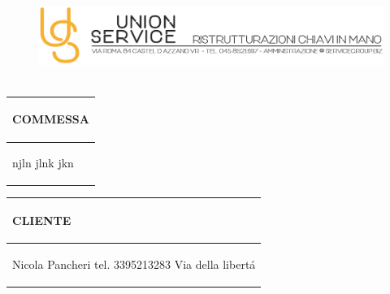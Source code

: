 \documentclass[a4paper]{article}
\begin{document}
                        \begin{figure}[!t]
                        \includegraphics[width=15.8cm, height=3cm]{intestazioneAlta2.jpg}
                        \end{figure}

                        \noindent\begin{tabular}{| L{72.2mm} |}
                            \hline
                            \vspace{2.5mm}
                            \begin{spacing}{0}
                            \textbf{COMMESSA}
                            \end{spacing}\\
                            \hline
                            \vspace{4mm}
                            \begin{spacing}{1.2}

                        njln \newline jlnk \newline jkn
                          \end{spacing}\\
                            \hline
                          \end{tabular}
                          \quad
                          \begin{tabular}{ | R{72.2mm} | }
                            \hline
                            \vspace{2.5mm}
                            \begin{spacing}{0}
                            \textbf{CLIENTE}
                            \end{spacing}\\
                            \hline
                            \vspace{4mm}
                            \begin{spacing}{1.2}

                       Nicola Pancheri \newline tel. 3395213283 \newline Via della libert\'a
                          \end{spacing}\\
                            \hline
                          \end{tabular}
\end{document}
